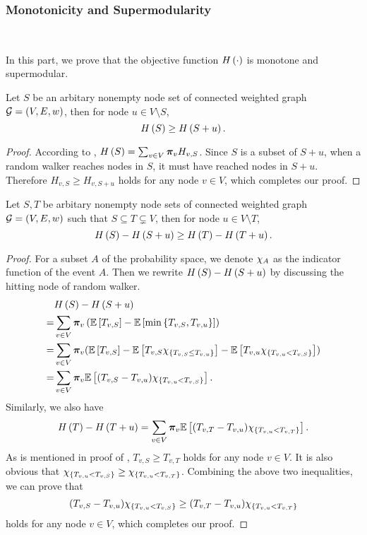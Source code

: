 \documentclass[sigconf]{acmart}
\begin{document}
\subsubsection{Monotonicity and Supermodularity}

\

In this part, we prove that the objective function \(H\left(\cdot\right)\) is monotone and supermodular.
\begin{theorem}[Monotonicity]\label{thm:mono}
  Let \(S\) be an arbitary nonempty node set of connected weighted graph \(\mathcal{G}=(V,E,w)\), then for node \(u\in V\setminus S\),
  \[H\left(S\right)\ge H\left(S+u\right).\]
\end{theorem}

\begin{proof}
  According to , \(H\left(S\right)=\sum_{v\in V}\boldsymbol{\pi}_vH_{v,S}\).
  Since \(S\) is a subset of \(S+u\), when a random walker reaches nodes in \(S\), it must have reached nodes in \(S+u\). Therefore \(H_{v,S}\ge H_{v,S+u}\) holds for any node \(v\in V\), which completes our proof.
\end{proof}

\begin{theorem}[Supermodularity]\label{thm:supermod}
  Let \(S,T\) be arbitary nonempty node sets of connected weighted graph \(\mathcal{G}=(V,E,w)\) such that \(S\subseteq T\subsetneq V\), then for node \(u\in V\setminus T\),
  \[H\left(S\right)-H\left(S+u\right)\ge H\left(T\right)-H\left(T+u\right).\]
\end{theorem}

\begin{proof}
  For a subset \(A\) of the probability space, we denote \(\chi_{A}\) as the indicator function of the event \(A\). Then we rewrite \(H\left(S\right)-H\left(S+u\right)\) by discussing the hitting node of random walker.
  \begin{align*}
      & H\left(S\right)-H\left(S+u\right)                                                                                                                      \\
    = & \sum_{v\in V}\boldsymbol{\pi}_v\left( \mathbb{E}\left[T_{v,S}\right]-\mathbb{E}\left[\min\left\{T_{v,S},T_{v,u} \right\}\right] \right)                                                           \\
    = & \sum_{v\in V}\boldsymbol{\pi}_v(\mathbb{E}\left[T_{v,S}\right]-\mathbb{E}\left[T_{v,S}\chi_{\left\{T_{v,S}\le T_{v,u} \right\}}\right]-\mathbb{E}\left[T_{v,u}\chi_{\left\{T_{v,u}<T_{v,S} \right\}}\right]) \\
    = & \sum_{v\in V}\boldsymbol{\pi}_v\mathbb{E}\left[(T_{v,S}-T_{v,u})\chi_{\left\{T_{v,u}<T_{v,S} \right\}}\right].
  \end{align*}
  Similarly, we also have
  \[H\left(T\right)-H\left(T+u\right)=\sum_{v\in V}\boldsymbol{\pi}_v\mathbb{E}\left[(T_{v,T}-T_{v,u})\chi_{\left\{T_{v,u}<T_{v,T} \right\}}\right].\]
  As is mentioned in proof of , \(T_{v,S}\ge T_{v,T}\) holds for any node \(v\in V\).
  It is also obvious that \(\chi_{\left\{T_{v,u}<T_{v,S} \right\}}\ge\chi_{\left\{T_{v,u}<T_{v,T} \right\}}\).
  Combining the above two inequalities, we can prove that
  \[(T_{v,S}-T_{v,u})\chi_{\left\{T_{v,u}<T_{v,S} \right\}}\ge(T_{v,T}-T_{v,u})\chi_{\left\{T_{v,u}<T_{v,T} \right\}}\]
  holds for any node \(v\in V\), which completes our proof.
\end{proof}
\end{document}
